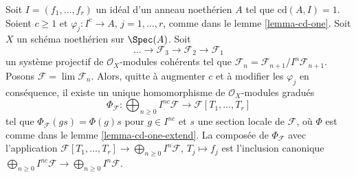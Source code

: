 \begin{lemma}
\label{lemma-cd-is-one-for-system}
Soit $I = (f_1, \ldots, f_r)$ un idéal d'un anneau noethérien $A$ tel que
$\text{cd}(A, I) = 1$. Soient $c \geq 1$ et $\varphi_j : I^c \to A$,
$j = 1, \ldots, r$, comme dans le lemme \ref{lemma-cd-one}.
Soit $X$ un schéma noethérien sur $\Spec(A)$. Soit
$$
\ldots \to \mathcal{F}_3 \to \mathcal{F}_2 \to \mathcal{F}_1
$$
un système projectif de $\mathcal{O}_X$-modules cohérents
tel que $\mathcal{F}_n = \mathcal{F}_{n + 1}/I^n\mathcal{F}_{n + 1}$.
Posons $\mathcal{F} = \lim \mathcal{F}_n$.
Alors, quitte à augmenter $c$ et à modifier les $\varphi_j$ en conséquence,
il existe un unique homomorphisme de $\mathcal{O}_X$-modules gradués
$$
\Phi_\mathcal{F} :
\bigoplus\nolimits_{n \geq 0} I^{nc}\mathcal{F}
\longrightarrow
\mathcal{F}[T_1, \ldots, T_r]
$$
tel que $\Phi_\mathcal{F}(g s) = \Phi(g) s$ pour $g \in I^{nc}$ et
$s$ une section locale de $\mathcal{F}$, où $\Phi$ est comme dans le
lemme \ref{lemma-cd-one-extend}. La composée de $\Phi_\mathcal{F}$
avec l'application
$\mathcal{F}[T_1, \ldots, T_r] \to \bigoplus_{n \geq 0} I^n\mathcal{F}$,
$T_j \mapsto f_j$
est l'inclusion canonique
$\bigoplus_{n \geq 0} I^{nc}\mathcal{F} \to
\bigoplus_{n \geq 0} I^n\mathcal{F}$.
\end{lemma}


